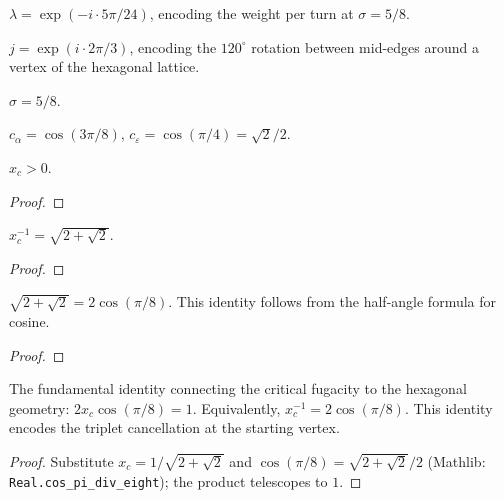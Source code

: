 \begin{definition}\label{def:lam}
\leanok
  $\lambda = \exp(-i \cdot 5\pi/24)$, encoding the weight per turn at $\sigma = 5/8$.
\end{definition}

\begin{definition}\label{def:j}
\leanok
  $j = \exp(i \cdot 2\pi/3)$, encoding the $120^\circ$ rotation between
  mid-edges around a vertex of the hexagonal lattice.
\end{definition}

\begin{definition}\label{def:sigma}
\leanok
  $\sigma = 5/8$.
\end{definition}

\begin{definition}\label{def:boundary_coeffs}
\leanok
  $c_\alpha = \cos(3\pi/8)$, \quad $c_\varepsilon = \cos(\pi/4) = \sqrt{2}/2$.
\end{definition}

\begin{lemma}[Positivity of $x_c$]\label{lem:xc_pos}
\leanok
{}
  $x_c > 0$.
\end{lemma}
\begin{proof}
\leanok
\end{proof}

\begin{lemma}[Inverse of $x_c$]\label{lem:xc_inv}
\leanok
{}
  $x_c^{-1} = \sqrt{2+\sqrt{2}}$.
\end{lemma}
\begin{proof}
\leanok
\end{proof}

\begin{lemma}[$\sqrt{2+\sqrt{2}} = 2\cos(\pi/8)$]\label{lem:sqrt_eq_cos}
\leanok
{}
  $\sqrt{2+\sqrt{2}} = 2\cos(\pi/8)$.
  This identity follows from the half-angle formula for cosine.
\end{lemma}
\begin{proof}
\leanok
\end{proof}

\begin{lemma}[$2x_c\cos(\pi/8)=1$]\label{lem:two_xc_cos}
\leanok
{}
  The fundamental identity connecting the critical fugacity to the hexagonal geometry:
  $2x_c \cos(\pi/8) = 1$.
  Equivalently, $x_c^{-1} = 2\cos(\pi/8)$.
  This identity encodes the triplet cancellation at the starting vertex.
\end{lemma}
\begin{proof}
\leanok
  Substitute $x_c = 1/\sqrt{2+\sqrt{2}}$ and $\cos(\pi/8) = \sqrt{2+\sqrt{2}}/2$
  (Mathlib: \texttt{Real.cos\_pi\_div\_eight}); the product telescopes to $1$.
\end{proof}

